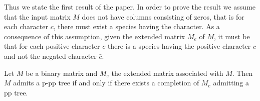 \documentclass{llncs}
\begin{document}
\vspace{.2in}

Thus we state the first result of the paper. In order to prove the result we assume that the input matrix $M$  does not have columns consisting of zeros, that is for each character $c$, there must exist a species having the character. As a consequence of this assumption, given the extended matrix $M_e$ of $M$, it must be that for each positive character $c$ there is a species having   the positive character  $c$ and not the negated character $\bar{c}$.

\begin{theorem}
\label{equivalence}
Let $M$  be a binary matrix and $M_e$ the extended matrix   associated with $M$. Then $M$  admits a p-pp tree if and only if there
exists a  completion  of $M_e$   admitting
a pp tree.
\end{theorem}
\end{document}
